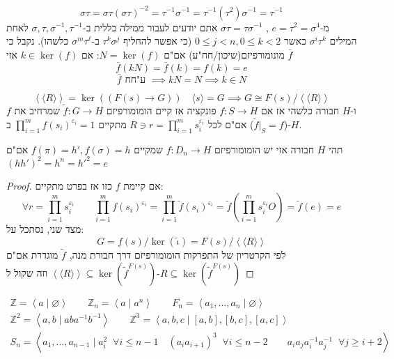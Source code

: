 \documentclass{tstextbook}
\begin{document}
$$\sigma \tau=\sigma \tau\left( \sigma \tau \right)^{-2}=\tau ^{-1} \sigma ^{-1} =\tau ^{-1} \left( \tau^2 \right)\sigma ^{-1} =\tau ^{-1}$$
מ-\(e=\tau^2=\sigma^4\) , \(\sigma \tau=\tau \sigma ^{-1}\) אתם יודעים לעבור ממילה כללית ב-\(\sigma ,\tau,\sigma ^{-1} ,\tau ^{-1}\) לאחת המילים \(\sigma^i\tau^k\) כאשר \(0\leq j<n,0\leq k<2\) (כי אפשר להחליף \(\tau^k \sigma^j\) ב-\(\sigma^m\tau^\ell\) כלשהו).
נקבל כי \(\bar{f}\) מונומורפיזם(שיכון/חח"ע) אם"ם \(N=\ker(f)\): אם \(k\in \ker(f)\) אזי $$\bar{f}(kN)=\bar{f}(k)=f(k)=e$$$$\bar{f} \text{ ע"חח } \implies kN=N\implies k\in N$$

\begin{proposition}
$$\left\langle  \langle R\rangle  \right\rangle =\ker\left( \left( F(s)\to G \right) \right) \quad \langle s\rangle =G\implies G\cong F(s) / \left\langle  \langle R\rangle  \right\rangle$$
ו-\(H\) חבורה כלשהי אז אם \(f:S\to H\) פונקציה אז קיים הומומורפיזם \(\tilde{f}:G\to H\) שמרחיב את \(f\) (\(\tilde{f}|_{S}=f\)) אם"ם לכל \(R\ni r=\prod_{i=1}^m s_{i}^{\varepsilon_{i}}\) מתקיים \(\prod_{i=1}^mf(s_{i})^{\varepsilon_{i}}=1\) ב-\(H\).

\end{proposition}
\begin{example}
תהי \(H\) חבורה אזי יש הומומורפיזם \(f:D_{n}\to H\) שמקיים \(f\left( \pi \right)=h', f\left( \sigma \right)=h\) אם"ם \((hh')^2=h^n=h'^2=e\)

\end{example}
\begin{proof}
אם קיימת \(f\) כזו אז בפרט מתקיים:
$$\forall r=\prod_{i=1}^m s_{i}^{\varepsilon_{i}}\qquad \prod_{i=1}^{m}f(s_{i})^{\varepsilon_{i}}=\prod_{i=1}^{m}\tilde{f}(s_{i})^{\varepsilon_{i}}=\tilde{f}\left( \prod_{i=1}^{m}s_{i}^{\varepsilon_{i}}O \right)=\tilde{f}(e)=e$$
מצד שני, נסתכל על:
$$G= f(s) / \ker\left( \tilde{\iota} \right)=F(s) / \left\langle  \langle R\rangle  \right\rangle$$
לפי הקרטריון של התפרקות הומומורפיזם דרך חבורת מנה, \(\tilde{f}\) מוגדרת אם"ם \(\left\langle  \langle R\rangle  \right\rangle\subseteq \ker\left( \tilde{f}^{F(s)} \right)\)
וזה שקול ל-\(R\subseteq \ker\left( \tilde{f}^{F(s)} \right)\)

\end{proof}
\begin{example}
$$\begin{gathered}\mathbb{Z} =\left\langle  a\mid \varnothing\right\rangle \qquad \mathbb{Z} _{n}=\left\langle  a\mid a^n \right\rangle \qquad F_{n}=\left\langle  a_{1},\dots,a_{n}\mid \varnothing\right\rangle \\ \mathbb{Z} ^2=\left\langle  a,b\mid aba^{-1} b^{-1}  \right\rangle  \qquad \mathbb{Z}^3=\left\langle  a,b,c\mid[a,b],[b,c],[a,c] \right\rangle   \\S_{n}=\left\langle  a_{1},\dots,a_{n-1}\mid a_{i}^2 \;\;\forall i\leq n-1\quad (a_{i}a_{i+1})^3\;\;\forall i\leq n-2\qquad a_{i}a_{j}a_{i}^{-1} a_{j}^{-1}\;\; \forall j\geq i+2 \right\rangle
\end{gathered}$$

\end{example}
\end{document}
